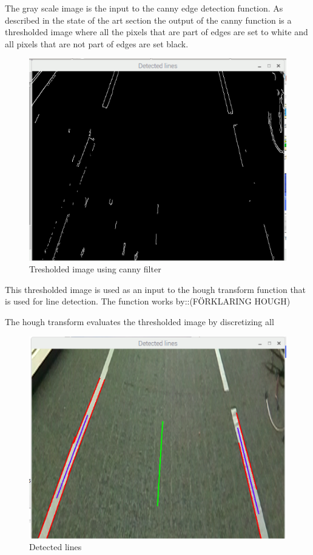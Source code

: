 The gray scale image is the input to the canny edge detection function. As described in the state of the art section the output of the canny function is a thresholded image where all the pixels that are part of edges are set to white and all pixels that are not part of edges are set black.

\begin{figure}[H]
  \includegraphics[width=\textwidth]{./img/edges.png}
  \centering
  \caption{Tresholded image using canny filter}
  \label{fig:Tresholded image using canny filter}
\end{figure}

This thresholded image is used as an input to the hough transform function that is used for line detection. The function works by::(FÖRKLARING HOUGH)


The hough transform evaluates the thresholded image by discretizing all


\begin{figure}[H]
  \includegraphics[width=\textwidth]{./img/detected_lines.png}
  \centering
  \caption{Detected lines}
  \label{fig:Detected lines}
\end{figure}


